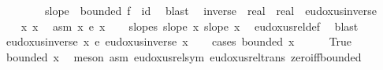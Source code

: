 \begin{isabellebody}
\ \ \isacommand{{\isacharbraceright}{\kern0pt}}\isamarkupfalse%
\isanewline
\ \ \isamarkupfalse%
\ \isamarkupfalse%
\ {\isacharquery}{\kern0pt}slope\ {\isachardoublequoteopen}{\isasymnot}\ bounded\ f\ {\isasymLongrightarrow}\ {\isacharquery}{\kern0pt}id{\isachardoublequoteclose}\ \isamarkupfalse%
\ blast{\isacharplus}{\kern0pt}\isanewline
{}\isamarkupfalse%
%
\endisatagproof
{\isafoldproof}%
%
\isadelimproof
\isanewline
%
\endisadelimproof
\isanewline
{}\isamarkupfalse%
\isanewline
\ \ {\isachardoublequoteopen}{\isacharparenleft}{\kern0pt}inverse\ {\isacharcolon}{\kern0pt}{\isacharcolon}{\kern0pt}\ real\ {\isasymRightarrow}\ real{\isacharparenright}{\kern0pt}{\isachardoublequoteclose}\ \ eudoxus{\isacharunderscore}{\kern0pt}inverse\isanewline
%
\isadelimproof
%
\endisadelimproof
%
\isatagproof
{}\isamarkupfalse%
\ {\isacharminus}{\kern0pt}\isanewline
\ \ \isamarkupfalse%
\ x\ x{\isacharprime}{\kern0pt}\ \isamarkupfalse%
\ asm{\isacharcolon}{\kern0pt}\ {\isachardoublequoteopen}x\ {\isasymsim}\isactrlsub e\ x{\isacharprime}{\kern0pt}{\isachardoublequoteclose}\isanewline
\ \ \isamarkupfalse%
\ slopes{\isacharcolon}{\kern0pt}\ {\isachardoublequoteopen}slope\ x{\isachardoublequoteclose}\ {\isachardoublequoteopen}slope\ x{\isacharprime}{\kern0pt}{\isachardoublequoteclose}\ \isamarkupfalse%
\ eudoxus{\isacharunderscore}{\kern0pt}rel{\isacharunderscore}{\kern0pt}def\ \isamarkupfalse%
\ blast{\isacharplus}{\kern0pt}\isanewline
\ \ \isamarkupfalse%
\ {\isachardoublequoteopen}eudoxus{\isacharunderscore}{\kern0pt}inverse\ x\ {\isasymsim}\isactrlsub e\ eudoxus{\isacharunderscore}{\kern0pt}inverse\ x{\isacharprime}{\kern0pt}{\isachardoublequoteclose}\isanewline
\ \ \isamarkupfalse%
\ {\isacharparenleft}{\kern0pt}cases\ {\isachardoublequoteopen}bounded\ x{\isachardoublequoteclose}{\isacharparenright}{\kern0pt}\isanewline
\ \ \ \ \isamarkupfalse%
\ True\isanewline
\ \ \ \ \isamarkupfalse%
\ {\isachardoublequoteopen}bounded\ x{\isacharprime}{\kern0pt}{\isachardoublequoteclose}\ \isamarkupfalse%
\ {\isacharparenleft}{\kern0pt}meson\ asm\ eudoxus{\isacharunderscore}{\kern0pt}rel{\isacharunderscore}{\kern0pt}sym\ eudoxus{\isacharunderscore}{\kern0pt}rel{\isacharunderscore}{\kern0pt}trans\ zero{\isacharunderscore}{\kern0pt}iff{\isacharunderscore}{\kern0pt}bounded{\isacharparenright}{\kern0pt}\isanewline

\end{isabellebody}
